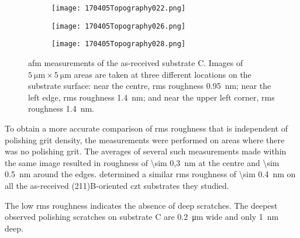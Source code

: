 \begin{figure}[htbp]
    \centering
    \begin{subfigure}[t]{0.3\linewidth}
    \centering
        \texttt{[image: 170405Topography022.png]}
        \caption{}%
        \label{fig:subCa_afm_centre}
    \end{subfigure}
    \hfill
    \begin{subfigure}[t]{0.3\linewidth}
    \centering
        \texttt{[image: 170405Topography026.png]}
        \caption{}%
        \label{fig:subCa_afm_edge}
    \end{subfigure}
    \hfill
    \begin{subfigure}[t]{0.3\linewidth}
    \centering
        \texttt{[image: 170405Topography028.png]}
        \caption{}%
        \label{fig:subCa_afm_corner}
    \end{subfigure}
    \caption[\Ac{afm} of as-received substrate C.]{\Acf{afm} measurements of the as-received substrate C. Images of $\SI{5}{\micro\metre}\times\SI{5}{\micro\metre}$ areas are taken at three different locations on the substrate surface:  near the centre, \ac{rms} roughness \SI{0.95}{\nano\metre};  near the left edge, \ac{rms} roughness \SI{1.4}{\nano\metre}; and  near the upper left corner, \ac{rms} roughness \SI{1.4}{\nano\metre}.}
    \label{fig:subCa_afm}
\end{figure} %

To obtain a more accurate comparison of \ac{rms} roughness that is independent of polishing grit density, the measurements were performed on areas where there was no polishing grit. The averages of several such measurements made within the same image resulted in  roughness of \SI{\sim 0,3}{\nano\metre} at the centre and \SI{\sim 0.5}{\nano\metre} around the edges. \citet{benson2015as-received} determined a similar \ac{rms} roughness of \SI{\sim 0.4}{\nano\metre} on all the as-received (211)B-oriented \ac{czt} substrates they studied.

The low \ac{rms} roughness indicates the absence of deep scratches. The deepest observed polishing scratches on substrate C are \SI{0,2}{\micro\metre} wide and only \SI{1}{\nano\metre} deep. 

